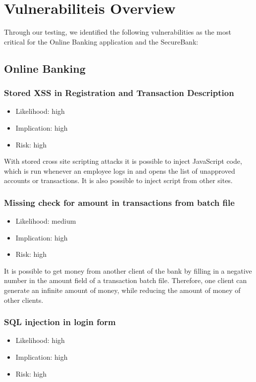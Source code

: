 \chapter{Vulnerabiliteis Overview}\label{chapter:vulnerabilies}

Through our testing, we identified the following vulnerabilities as the most critical for the Online Banking application and the SecureBank:

\section{Online Banking}
\subsection{Stored XSS in Registration and Transaction Description}
\begin{itemize}
	\item Likelihood: high
	\item Implication: high
	\item Risk: high
\end{itemize}

With stored cross site scripting attacks it is possible to inject JavaScript code, which is run whenever an employee logs in and opens the list of unapproved accounts or transactions. It is also possible to inject script from other sites.

\subsection{Missing check for amount in transactions from batch file}
\begin{itemize}
	\item Likelihood: medium
	\item Implication: high
	\item Risk: high
\end{itemize}

It is possible to get money from another client of the bank by filling in a negative number in the amount field of a transaction batch file. Therefore, one client can generate an infinite amount of money, while reducing the amount of money of other clients.

\subsection{SQL injection in login form}
\begin{itemize}
	\item Likelihood: high
	\item Implication: high
	\item Risk: high
\end{itemize}

